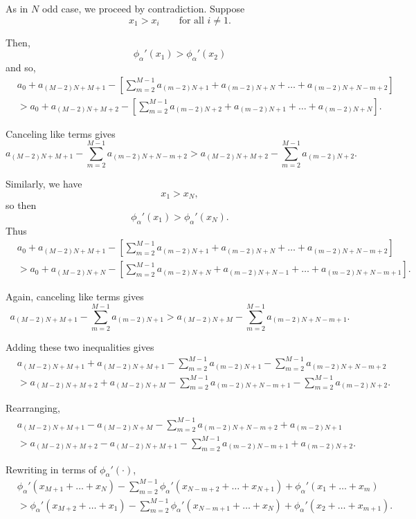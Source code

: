\documentclass{article}
\begin{document}
As in $N$ odd case, we proceed by contradiction. Suppose
\[
x_1>x_i
\qquad
\text{for all }i\neq1.
\]

Then,
\[
\phi_\alpha'(x_1)
>
\phi_\alpha'(x_2)
\]
and so,
\begin{align*}
&
a_0
+
a_{(M-2)N+M+1}
-
\left[
\sum_{m=2}^{M-1}
a_{(m-2)N+1}
+
a_{(m-2)N+N}
+\dots+
a_{(m-2)N+N-m+2}
\right]
\\
&>
a_0
+
a_{(M-2)N+M+2}
-
\left[
\sum_{m=2}^{M-1}
a_{(m-2)N+2}
+
a_{(m-2)N+1}
+\dots+
a_{(m-2)N+N}
\right].
\end{align*}

Canceling like terms gives
\[
a_{(M-2)N+M+1}
-
\sum_{m=2}^{M-1}
a_{(m-2)N+N-m+2}
>
a_{(M-2)N+M+2}
-
\sum_{m=2}^{M-1}
a_{(m-2)N+2}.
\]

Similarly, we have \[x_1>x_N,\] 
so then
\[
\phi_\alpha'(x_1)
>
\phi_\alpha'(x_N).
\]
Thus
\begin{align*}
&
a_0
+
a_{(M-2)N+M+1}
-
\left[
\sum_{m=2}^{M-1}
a_{(m-2)N+1}
+
a_{(m-2)N+N}
+\dots+
a_{(m-2)N+N-m+2}
\right]
\\
&>
a_0
+
a_{(M-2)N+N}
-
\left[
\sum_{m=2}^{M-1}
a_{(m-2)N+N}
+
a_{(m-2)N+N-1}
+\dots+
a_{(m-2)N+N-m+1}
\right].
\end{align*}

Again, canceling like terms gives
\[
a_{(M-2)N+M+1}
-
\sum_{m=2}^{M-1}
a_{(m-2)N+1}
>
a_{(M-2)N+M}
-
\sum_{m=2}^{M-1}
a_{(m-2)N+N-m+1}.
\]

Adding these two inequalities gives
\begin{align*}
&
a_{(M-2)N+M+1}
+
a_{(M-2)N+M+1}
-
\sum_{m=2}^{M-1}a_{(m-2)N+1}
-
\sum_{m=2}^{M-1}a_{(m-2)N+N-m+2}
\\
&>
a_{(M-2)N+M+2}
+
a_{(M-2)N+M}
-
\sum_{m=2}^{M-1}a_{(m-2)N+N-m+1}
-
\sum_{m=2}^{M-1}a_{(m-2)N+2}.
\end{align*}

Rearranging,
\begin{align*}
&
a_{(M-2)N+M+1}
-
a_{(M-2)N+M}
-
\sum_{m=2}^{M-1}
a_{(m-2)N+N-m+2}
+
a_{(m-2)N+1}
\\
&>
a_{(M-2)N+M+2}
-
a_{(M-2)N+M+1}
-
\sum_{m=2}^{M-1}
a_{(m-2)N-m+1}
+
a_{(m-2)N+2}.
\end{align*}

Rewriting in terms of $\phi_\alpha'(\cdot)$,
\begin{align*}
&
\phi_\alpha'(x_{M+1}+\dots+x_N)
-
\sum_{m=2}^{M-1}
\phi_\alpha'(x_{N-m+2}+\dots+x_{N+1})
+
\phi_\alpha'(x_1+\dots+x_m)
\\
&>
\phi_\alpha'(x_{M+2}+\dots+x_1)
-
\sum_{m=2}^{M-1}
\phi_\alpha'(x_{N-m+1}+\dots+x_N)
+
\phi_\alpha'(x_2+\dots+x_{m+1}).
\end{align*}
\end{document}
